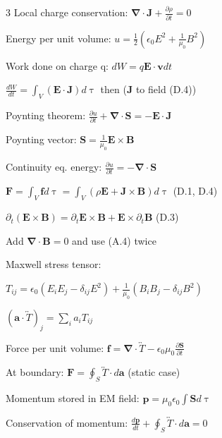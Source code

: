 \documentclass[a4paper,twoside]{article}
\begin{document}
\begin{multicols*}{3}
Local charge conservation:
\(\bm \nabla \cdot \bm J + \frac{\partial \rho}{\partial t} = 0\)


Energy per unit volume:
\(u = \frac{1}{2} (\epsilon_0 E^2 + \frac{1}{\mu_0} B^2)\)

Work done on charge q:
\(dW = q \bm E \cdot \bm v dt\) 

\(\frac{dW}{dt} = \int_{V} (\bm E \cdot \bm J) d\uptau\) then (\(\bm J \) to field (D.4))

Poynting theorem:
\(\frac{\partial u}{\partial t} + \bm \nabla \cdot \bm S = -\bm E \cdot \bm J\)

Poynting vector:
\(\bm S = \frac{1}{\mu_0} \bm E \times \bm B\)

Continuity eq. energy:
\(\frac{\partial u}{\partial t} = -\bm \nabla \cdot \bm S \)


\(\bm F = \int_V \bm f d\uptau = \int_V (\rho \bm E + \bm J \times \bm B) d\uptau \) (D.1, D.4)   

\(
\partial_t (\bm E \times \bm B) = \partial_t\bm E \times \bm B + \bm E \times \partial_t \bm B
\) (D.3)

Add \(\bm \nabla \cdot \bm B=0\) and use (A.4) twice


Maxwell stress tensor:

\(T_{ij} = \epsilon_0 (E_iE_j-\delta_{ij}E^2) +\frac{1}{\mu_0} (B_iB_j-\delta_{ij}B^2)\)

\((\bm a \cdot \overleftrightarrow{T})_j = \sum_i a_i T_{ij}\)

Force per unit volume:
\(\bm f = \bm\nabla \cdot \overleftrightarrow{T} - \epsilon_0 \mu_0 \frac{\partial \bm S}{\partial t}\)



At boundary:
\(\bm F = \oint _S \overleftrightarrow{T} \cdot d\bm a\) (static case)


Momentum stored in EM field:
\(\bm p = \mu_0 \epsilon_0 \int \bm S d\uptau  \)

Conservation of momentum:
\(\frac{d\bm p}{dt} + \oint_S \overleftrightarrow{T} \cdot d\bm a = 0\)


\end{multicols*}
\end{document}
